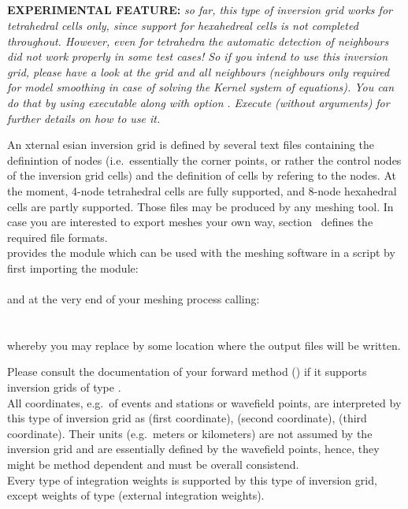 \subsection{} \label{basic_steps,sec:invgrid,sub:ecart}
%
{\bf EXPERIMENTAL FEATURE:} \emph{so far, this type of inversion grid works for tetrahedral cells only,
since support for hexahedreal cells is not completed throughout. However, even for tetrahedra the automatic detection 
of neighbours did not work properly in some test cases! So if you intend to use this inversion grid, please have a look 
at the grid and all neighbours (neighbours only required for model smoothing in case of solving the Kernel system of equations).
You can do that by using executable}  \emph{along with option}  \emph{. Execute} 
 \emph{(without arguments)}  \emph{for further details on how to use it.}

An xternal esian inversion grid is defined by several text files containing the definintion 
of nodes (i.e.\  essentially the corner points, or rather the control nodes of the inversion grid cells) and the 
definition of cells by refering to the nodes. At the moment, 4-node tetrahedral cells are fully supported, and 8-node 
hexahedral cells are partly supported. 
Those files may be produced by any meshing tool. In case you are interested to export meshes your own way, 
section~ defines the required file formats.\\
\ASKI{} provides the  module  which can be used with the 
meshing software  in a  script by first importing the module:\\
\\
and at the very end of your meshing process calling:\\
\\
\\
whereby you may replace  by some location where the output files will be written.

Please consult the documentation of your forward method () if it supports
inversion grids of type . \\
All coordinates, e.g.\ of events and stations or wavefield points, are interpreted by this type of inversion grid as
 (first coordinate),  (second coordinate),  (third coordinate). Their
units (e.g.\ meters or kilometers) are not assumed by the inversion grid and are essentially defined by the wavefield
points, hence, they might be method dependent and must be overall consistend.\\
Every type of integration weights is supported by this type of inversion grid, except weights of type 
 (external integration weights).

